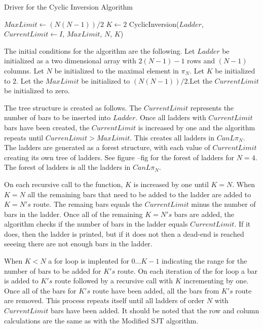 \begin{algorithm}
  \caption{Driver for the Cyclic Inversion Algorithm}
  \begin{algorithmic}[1]
      \State $MaxLimit \gets (N(N-1))/2$
      \State $K \gets 2$
        \State CyclicInversion($Ladder$, $CurrentLimit \gets I$, $MaxLimit$, $N$, $K$)

      \EndFor

    \EndFunction
  \end{algorithmic}
\end{algorithm}\pagebreak

The initial conditions for the algorithm are the following. Let $Ladder$ be initialized as a two dimensional array with $2(N-1)-1$ rows and $(N-1)$ columns.  Let $N$ be initialized to the maximal element in $\pi_{N}$. 
Let $K$ be initialized to $2$.
Let the $MaxLimit$ be initialized to $(N(N-1))/2$.Let the $CurrentLimit$ be initialized to zero. 

The tree structure is created as follows. The $CurrentLimit$ 
represents the number of bars to be inserted into $Ladder$. Once all ladders with $CurrentLimit$ bars have been created, the $CurrentLimit$ is increased by one 
and the algorithm repeats until $CurrenLimit > MaxLimit$. This creates all ladders in $CanL{\pi_{N}}$. The ladders are generated as a forest structure,
 with each value of $CurrentLimit$ creating its own tree of ladders. See figure --fig for the 
forest of ladders for $N=4$. The forest of ladders is all the ladders in $CanL{\pi_{N}}$. 

On each recursive call to the function, $K$ is increased by one until $K=N$. When $K=N$ all the remaining bars that need to 
be added to the ladder are added to $K=N's$ route. The remaing bars equals the $CurrentLimit$ minus the number of bars in the ladder.
Once all of the remaining $K=N's$ bars are added, the algorithm 
checks if the number of bars in the ladder equals $CurrentLimit$. If it does, then the ladder is printed, but if it 
does not then a dead-end is reached seeeing there are not enough bars in the ladder.\par 
When $K < N$ a for loop is implented for $0 \dots K-1$ indicating the range for the number of bars 
to be added for $K's$ route. On each iteration of the for loop a bar is added to $K's$ route followed by a 
recursive call with $K$ incrementing by one. Once all of the bars for $K's$ route have been added, all 
the bars from $K's$ route are removed. This process repeats itself until all ladders of order $N$ with 
$CurrentLimit$ bars have been added. It should be noted that the row and column calculations are the same as with the Modified SJT algorithm. 


